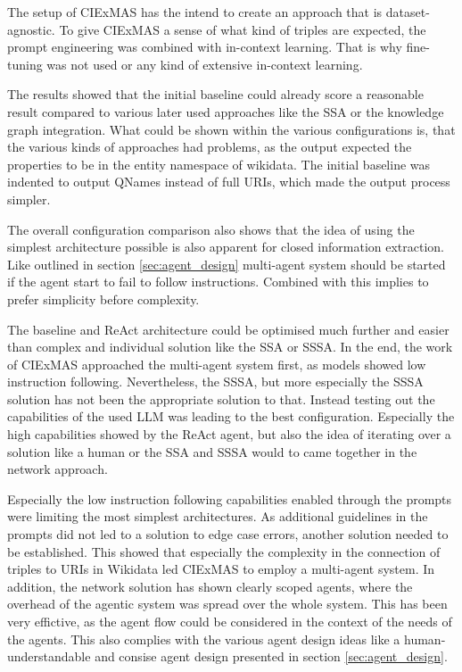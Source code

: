 \documentclass[a4paper,oneside,bibliography=totoc]{scrbook}
\begin{document}
The setup of CIExMAS has the intend to create an approach that is dataset-agnostic. To give CIExMAS a sense of what kind of triples are expected, the prompt engineering was combined with in-context learning. That is why fine-tuning was not used or any kind of extensive in-context learning.

The results showed that the initial baseline could already score a reasonable result compared to various later used approaches like the \ac{SSA} or the knowledge graph integration. What could be shown within the various configurations is, that the various kinds of approaches had problems, as the output expected the properties to be in the entity namespace of wikidata. The initial baseline was indented to output QNames instead of full URIs, which made the output process simpler.

The overall configuration comparison also shows that the idea of using the simplest architecture possible is also apparent for closed information extraction. Like outlined in section \ref{sec:agent_design} multi-agent system should be started if the agent start to fail to follow instructions. Combined with \citet{Anthropic2024} this implies to prefer simplicity before complexity.

The baseline and ReAct architecture could be optimised much further and easier than complex and individual solution like the \ac{SSA} or \ac{SSSA}. In the end, the work of CIExMAS approached the multi-agent system first, as models showed low instruction following. Nevertheless, the \ac{SSSA}, but more especially the \ac{SSSA} solution has not been the appropriate solution to that. Instead testing out the capabilities of the used \ac{LLM} was leading to the best configuration. Especially the high capabilities showed by the ReAct agent, but also the idea of iterating over a solution like a human or the \ac{SSA} and \ac{SSSA} would to came together in the network approach.

Especially the low instruction following capabilities enabled through the prompts were limiting the most simplest architectures. As additional guidelines in the prompts did not led to a solution to edge case errors, another solution needed to be established. This showed that especially the complexity in the connection of triples to URIs in Wikidata led CIExMAS to employ a multi-agent system. In addition, the network solution has shown clearly scoped agents, where the overhead of the agentic system was spread over the whole system. This has been very effictive, as the agent flow could be considered in the context of the needs of the agents. This also complies with the various agent design ideas like a human-understandable and consise agent design presented in section \ref{sec:agent_design}.
\end{document}
